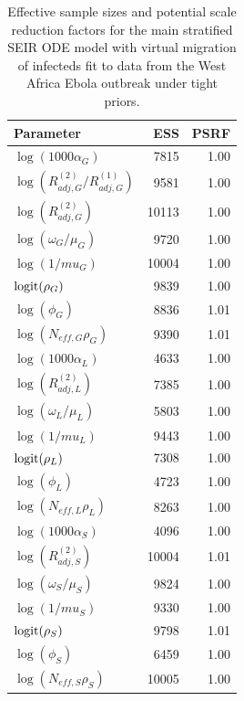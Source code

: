 \begin{table}[htbp]
	\caption{Effective sample sizes and potential scale reduction factors for the main stratified SEIR ODE model with virtual migration of infecteds fit to data from the West Africa Ebola outbreak under tight priors.}
	\centering\footnotesize
	\begin{tabular}{lrr}
		\hline
		\textbf{Parameter} & \textbf{ESS} & \textbf{PSRF} \\ 
		\hline
		$ \log(1000\alpha_G) $ & 7815 & 1.00 \\ 
		$ \log(R_{adj,G}^{(2)} / R_{adj,G}^{(1)}) $& 9581 & 1.00 \\ 
		$ \log(R_{adj,G}^{(2)}) $& 10113 & 1.00 \\ 
		$ \log(\omega_G/\mu_G) $ & 9720 & 1.00 \\ 
		$ \log(1/mu_G) $& 10004 & 1.00 \\ 
		$ \mathrm{logit}(\rho_G) $ & 9839 & 1.00 \\ 
		$ \log(\phi_G) $& 8836 & 1.01 \\ 
		$ \log(N_{eff,G}\rho_G) $& 9390 & 1.01 \\
		\hline 
		$ \log(1000\alpha_L) $ & 4633 & 1.00 \\ 
		$ \log(R_{adj,L}^{(2)}) $& 7385 & 1.00 \\ 
		$ \log(\omega_L/\mu_L) $ & 5803 & 1.00 \\ 
		$ \log(1/mu_L) $ & 9443 & 1.00 \\ 
		$ \mathrm{logit}(\rho_L) $ & 7308 & 1.00 \\ 
		$ \log(\phi_L) $ & 4723 & 1.00 \\ 
		$ \log(N_{eff,L}\rho_L) $ & 8263 & 1.00 \\ 
		\hline
		$ \log(1000\alpha_S) $ & 4096 & 1.00 \\ 
		$ \log(R_{adj,S}^{(2)}) $ & 10004 & 1.01 \\ 
		$ \log(\omega_S/\mu_S) $ & 9824 & 1.00 \\ 
		$ \log(1/mu_S) $ & 9330 & 1.00 \\ 
		$ \mathrm{logit}(\rho_S) $ & 9798 & 1.01 \\ 
		$ \log(\phi_S) $ & 6459 & 1.00 \\ 
		$ \log(N_{eff,S}\rho_S) $ & 10005 & 1.00 \\ 
		\hline
	\end{tabular}
\end{table}

